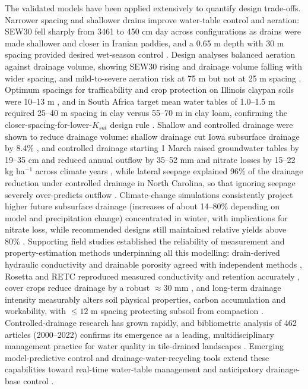 \documentclass[11pt]{article}
\begin{document}
The validated models have been applied extensively to quantify design trade-offs. Narrower spacing and shallower drains improve water-table control and aeration: SEW30 fell sharply from 3461 to 450 cm day across configurations as drains were made shallower and closer in Iranian paddies, and a 0.65 m depth with 30 m spacing provided desired wet-season control \parencite{DarziNaftchali2013,DarziNaftchally2014}. Design analyses balanced aeration against drainage volume, showing SEW30 rising and drainage volume falling with wider spacing, and mild-to-severe aeration risk at 75 m but not at 25 m spacing \parencite{Verma2014,Hirekhan2007}. Optimum spacings for trafficability and crop protection on Illinois claypan soils were 10--13 m \parencite{MOSTAGHIMI1989}, and in South Africa target mean water tables of 1.0--1.5 m required 25--40 m spacing in clay versus 55--70 m in clay loam, confirming the closer-spacing-for-lower-$K_{sat}$ design rule \parencite{Malota2015}. Shallow and controlled drainage were shown to reduce drainage volume: shallow drainage cut Iowa subsurface drainage by 8.4\% \parencite{Zhou2013,Mendez2004}, and controlled drainage starting 1 March raised groundwater tables by 19--35 cm and reduced annual outflow by 35--52 mm and nitrate losses by 15--22 kg ha$^{-1}$ across climate years \parencite{Kesicka2023}, while lateral seepage explained 96\% of the drainage reduction under controlled drainage in North Carolina, so that ignoring seepage severely over-predicts outflow \parencite{Youssef2021,Saadat2018,Österholm2015}. Climate-change simulations consistently project higher future subsurface drainage (increases of about 14--80\% depending on model and precipitation change) concentrated in winter, with implications for nitrate loss, while recommended designs still maintained relative yields above 80\% \parencite{Singh2009,Chen2016,Feng2018}. Supporting field studies established the reliability of measurement and property-estimation methods underpinning all this modelling: drain-derived hydraulic conductivity and drainable porosity agreed with independent methods \parencite{BUCKLAND1986}, Rosetta and RETC reproduced measured conductivity and retention accurately \parencite{Malota2022,Malota2024}, cover crops reduce drainage by a robust $\approx30$ mm \parencite{Meyer2019}, and long-term drainage intensity measurably alters soil physical properties, carbon accumulation and workability, with $\le12$ m spacing protecting subsoil from compaction \parencite{Omonode2025,Mante2022,Mante2018,Frison2009,Roy2020}. Controlled-drainage research has grown rapidly, and bibliometric analysis of 462 articles (2000--2022) confirms its emergence as a leading, multidisciplinary management practice for water quality in tile-drained landscapes \parencite{Kesicka2023b}. Emerging model-predictive control and drainage-water-recycling tools extend these capabilities toward real-time water-table management and anticipatory drainage-base control \parencite{Ikonen2023,Reinhart2020,VandeCraats2021,Ahmadi1995,HASEGAWA1994,GALLICHAND1992b,MCCARTHY1992,PalaciosVélez2004,Khan2007,Prathapar1996,Ghorbani2015,Skaggs2017,Singh2006,Singh1999,Gaj2022}.

\printbibliography
\end{document}
